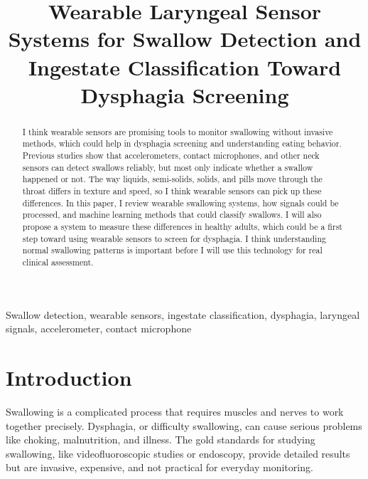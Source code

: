 \documentclass[conference]{IEEEtran}
\begin{document}
\title{Wearable Laryngeal Sensor Systems for Swallow Detection and Ingestate Classification Toward Dysphagia Screening}

\author{
}

\maketitle

\begin{abstract}
I think wearable sensors are promising tools to monitor swallowing without invasive methods, which could help in dysphagia screening and understanding eating behavior. Previous studies show that accelerometers, contact microphones, and other neck sensors can detect swallows reliably, but most only indicate whether a swallow happened or not. The way liquids, semi-solids, solids, and pills move through the throat differs in texture and speed, so I think wearable sensors can pick up these differences. In this paper, I review wearable swallowing systems, how signals could be processed, and machine learning methods that could classify swallows. I will also propose a system to measure these differences in healthy adults, which could be a first step toward using wearable sensors to screen for dysphagia. I think understanding normal swallowing patterns is important before I will use this technology for real clinical assessment.
\end{abstract}

\begin{IEEEkeywords}
Swallow detection, wearable sensors, ingestate classification, dysphagia, laryngeal signals, accelerometer, contact microphone
\end{IEEEkeywords}

\section{Introduction}

Swallowing is a complicated process that requires muscles and nerves to work together precisely. Dysphagia, or difficulty swallowing, can cause serious problems like choking, malnutrition, and illness. The gold standards for studying swallowing, like videofluoroscopic studies or endoscopy, provide detailed results but are invasive, expensive, and not practical for everyday monitoring.
\end{document}
